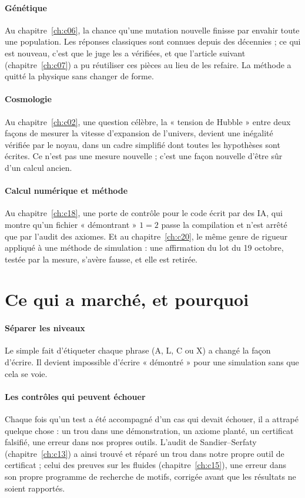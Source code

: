 \paragraph{Génétique} Au chapitre~\ref{ch:c06}, la chance qu'une mutation nouvelle finisse par envahir toute une
population. Les réponses classiques sont connues depuis des décennies ; ce qui est nouveau, c'est que le juge les a
vérifiées, et que l'article suivant (chapitre~\ref{ch:c07}) a pu réutiliser ces pièces au lieu de les refaire. La
méthode a quitté la physique sans changer de forme.

\paragraph{Cosmologie} Au chapitre~\ref{ch:c02}, une question célèbre, la « tension de Hubble » entre deux façons de
mesurer la vitesse d'expansion de l'univers, devient une inégalité vérifiée par le noyau, dans un cadre simplifié
dont toutes les hypothèses sont écrites. Ce n'est pas une mesure nouvelle ; c'est une façon nouvelle d'être sûr d'un
calcul ancien.

\paragraph{Calcul numérique et méthode} Au chapitre~\ref{ch:c18}, une porte de contrôle pour le code écrit par des
IA, qui montre qu'un fichier « démontrant » $1=2$ passe la compilation et n'est arrêté que par l'audit des axiomes. Et
au chapitre~\ref{ch:c20}, le même genre de rigueur appliqué à une méthode de simulation : une affirmation du lot du
19 octobre, testée par la mesure, s'avère fausse, et elle est retirée.

\section{Ce qui a marché, et pourquoi}

\paragraph{Séparer les niveaux} Le simple fait d'étiqueter chaque phrase (A, L, C ou X) a changé la façon d'écrire.
Il devient impossible d'écrire « démontré » pour une simulation sans que cela se voie.

\paragraph{Les contrôles qui peuvent échouer} Chaque fois qu'un test a été accompagné d'un cas qui devait échouer, il a
attrapé quelque chose : un trou dans une démonstration, un axiome planté, un certificat falsifié, une erreur dans nos
propres outils. L'audit de Sandier--Serfaty (chapitre~\ref{ch:c13}) a ainsi trouvé et réparé un trou dans notre propre
outil de certificat ; celui des preuves sur les fluides (chapitre~\ref{ch:c15}), une erreur dans son propre programme
de recherche de motifs, corrigée avant que les résultats ne soient rapportés.

